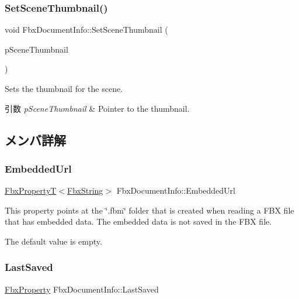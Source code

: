 \subsubsection{\texorpdfstring{Set\+Scene\+Thumbnail()}{SetSceneThumbnail()}}
{\footnotesize\ttfamily void Fbx\+Document\+Info\+::\+Set\+Scene\+Thumbnail (\begin{DoxyParamCaption}\item[{\hyperlink{class_fbx_thumbnail}{Fbx\+Thumbnail} $\ast$}]{p\+Scene\+Thumbnail }\end{DoxyParamCaption})}

Sets the thumbnail for the scene. 
\begin{DoxyParams}{引数}
{\em p\+Scene\+Thumbnail} & Pointer to the thumbnail. \\
\hline
\end{DoxyParams}


\subsection{メンバ詳解}
\mbox{\label{class_fbx_document_info_a650c0d0532a87408ccea6607a2c437bf}} 
\subsubsection{\texorpdfstring{Embedded\+Url}{EmbeddedUrl}}
{\footnotesize\ttfamily \hyperlink{class_fbx_property_t}{Fbx\+PropertyT}$<$\hyperlink{class_fbx_string}{Fbx\+String}$>$ Fbx\+Document\+Info\+::\+Embedded\+Url}

This property points at the \char`\"{}.\+fbm\char`\"{} folder that is created when reading a F\+BX file that has embedded data. The embedded data is not saved in the F\+BX file.

The default value is empty. \mbox{\label{class_fbx_document_info_a1f7b1001a8791ee8fc9f9655c543c84e}} 
\subsubsection{\texorpdfstring{Last\+Saved}{LastSaved}}
{\footnotesize\ttfamily \hyperlink{class_fbx_property}{Fbx\+Property} Fbx\+Document\+Info\+::\+Last\+Saved}

